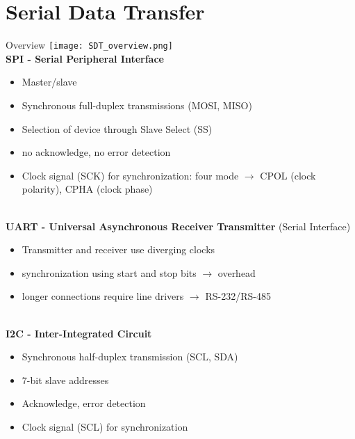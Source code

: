 \section{Serial Data Transfer}

\begin{concept}{Overview}
    \texttt{[image: SDT\_overview.png]}
    \vspace{2mm}\\
    \textbf{SPI - Serial Peripheral Interface}
    \begin{itemize}
        \item Master/slave
        \item Synchronous full-duplex transmissions (MOSI, MISO)
        \item Selection of device through Slave Select (SS)
        \item no acknowledge, no error detection
        \item Clock signal (SCK) for synchronization: four mode $\rightarrow$ CPOL (clock polarity), CPHA (clock phase)
    \end{itemize}
    \vspace{2mm}\\
    \textbf{UART - Universal Asynchronous Receiver Transmitter} (Serial Interface)
    \begin{itemize}
        \item Transmitter and receiver use diverging clocks
        \item synchronization using start and stop bits $\rightarrow$ overhead
        \item longer connections require line drivers $\rightarrow$ RS-232/RS-485
    \end{itemize}
    \vspace{2mm}\\
    \textbf{I2C - Inter-Integrated Circuit}
    \begin{itemize}
        \item Synchronous half-duplex transmission (SCL, SDA)
        \item 7-bit slave addresses
        \item Acknowledge, error detection
        \item Clock signal (SCL) for synchronization
    \end{itemize}
\end{concept}

